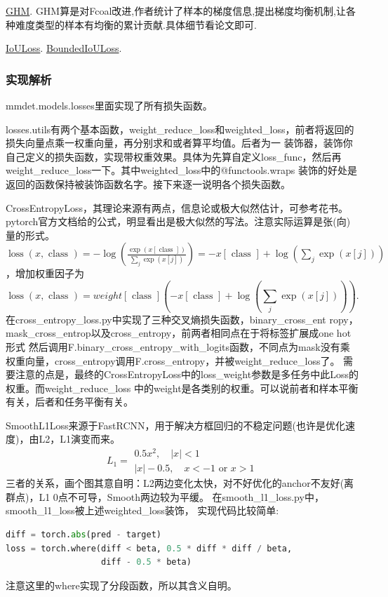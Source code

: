 \documentclass[UTF8]{ctexart}
\begin{document}
\href{https://arxiv.org/abs/1811.05181}{GHM}.
GHM算是对Fcoal改进,作者统计了样本的梯度信息,提出梯度均衡机制,让各种难度类型的样本有均衡的累计贡献.具体细节看论文即可.

\href{https://arxiv.org/abs/1908.03851}{IoULoss}.
\href{https://arxiv.org/abs/1711.00164}{BoundedIoULoss}.

\subsubsection{实现解析}
mmdet.models.losses里面实现了所有损失函数。

losses.utils有两个基本函数，weight\_reduce\_loss和weighted\_loss，前者将返回的损失向量点乘一权重向量，再分别求和或者算平均值。后者为一
装饰器，装饰你自己定义的损失函数，实现带权重效果。具体为先算自定义loss\_func，然后再weight\_reduce\_loss一下。其中weighted\_loss中的@functools.wraps
装饰的好处是返回的函数保持被装饰函数名字。接下来逐一说明各个损失函数。

CrossEntropyLoss，其理论来源有两点，信息论或极大似然估计，可参考花书。
pytorch官方文档给的公式，明显看出是极大似然的写法。注意实际运算是张(向)量的形式。
$\operatorname{loss}(x, \text { class })=-\log \left(\frac{\exp (x[\text { class }])}{\sum_{j} \exp (x[j])}\right)=
-x[\text { class }]+\log \left(\sum_{j} \exp (x[j])\right)$，增加权重因子为
$$\operatorname{loss}(x, \text { class })=
w e i g h t[\text { class }]
\left(-x[\text { class }]+\log \left(\sum_{j} \exp (x[j])\right)\right).$$
在cross\_entropy\_loss.py中实现了三种交叉熵损失函数，binary\_cross\_ent
ropy， mask\_cross\_entrop以及cross\_entropy，前两者相同点在于将标签扩展成one hot形式
然后调用F.binary\_cross\_entropy\_with\_logits函数，不同点为mask没有乘权重向量，cross\_entropy调用F.cross\_entropy，并被weight\_reduce\_loss了。
需要注意的点是，最终的CrossEntropyLoss中的loss\_weight参数是多任务中此Loss的权重。而weight\_reduce\_loss
中的weight是各类别的权重。可以说前者和样本平衡有关，后者和任务平衡有关。

SmoothL1Loss来源于FastRCNN，用于解决方框回归的不稳定问题(也许是优化速度)，由L2，L1演变而来。
$$L_{1}=\begin{array}{l}
	0.5 x^{2}, \quad|x|<1 \\
	|x|-0.5, \quad x<-1 \text { or } x>1
	\end{array}$$
三者的关系，画个图其意自明：L2两边变化太快，对不好优化的anchor不友好(离群点)，L1 0点不可导，Smooth两边较为平缓。
在smooth\_l1\_loss.py中，smooth\_l1\_loss被上述weighted\_loss装饰，
实现代码比较简单:
\lstset{style=mystyle}
\begin{lstlisting}[language=Python]
diff = torch.abs(pred - target)
loss = torch.where(diff < beta, 0.5 * diff * diff / beta,
				   diff - 0.5 * beta)
\end{lstlisting}
注意这里的where实现了分段函数，所以其含义自明。
\end{document}
